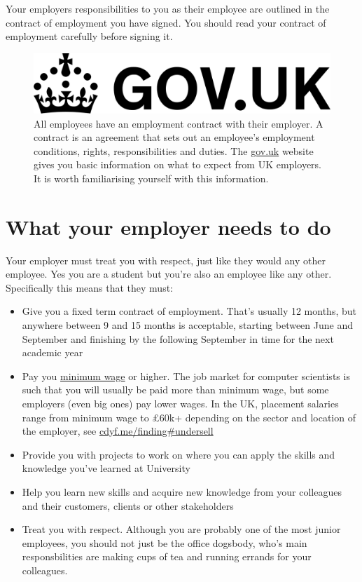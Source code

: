 \documentclass[
]{book}
\providecommand{\tightlist}{%
  \setlength{\itemsep}{0pt}\setlength{\parskip}{0pt}}
\begin{document}
Your employers responsibilities to you as their employee are outlined in the contract of employment you have signed. \citep{contract} You should read your contract of employment carefully before signing it.

\begin{figure}

{\centering \includegraphics[width=1\linewidth]{images/govuk} 

}

\caption{All employees have an employment contract with their employer. A contract is an agreement that sets out an employee's employment conditions, rights, responsibilities and duties. The \href{https://www.gov.uk/}{gov.uk} website gives you basic information on what to expect from UK employers. It is worth familiarising yourself with this information. \citep{contract, employee}}\label{fig:gov-fig}
\end{figure}



\section{What your employer needs to do}\label{eq}

Your employer must treat you with respect, just like they would any other employee. Yes you are a student but you're also an employee like any other. Specifically this means that they must:

\begin{itemize}
\tightlist
\item
  Give you a fixed term contract of employment. That's usually 12 months, but anywhere between 9 and 15 months is acceptable, starting between June and September and finishing by the following September in time for the next academic year \citep{employee}
\item
  Pay you \href{https://www.gov.uk/national-minimum-wage}{minimum wage} or higher. \citep{minimumwage} The job market for computer scientists is such that you will usually be paid more than minimum wage, but some employers (even big ones) pay lower wages. In the UK, placement salaries range from minimum wage to £60k+ depending on the sector and location of the employer, see \href{https://cdyf.me/finding\#undersell}{cdyf.me/finding\#undersell} \citep{finding}
\item
  Provide you with projects to work on where you can apply the skills and knowledge you've learned at University
\item
  Help you learn new skills and acquire new knowledge from your colleagues and their customers, clients or other stakeholders
\item
  Treat you with respect. Although you are probably one of the most junior employees, you should not just be the office dogsbody, who's main responsbilities are making cups of tea and running errands for your colleagues.
\end{itemize}
\end{document}
